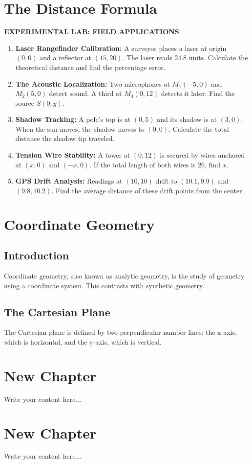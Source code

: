 \chapter{The Distance Formula}
\noindent
\colorbox{practicegreen}{\parbox{\dimexpr\linewidth-2\fboxsep}{\centering\small\bfseries\color{white} EXPERIMENTAL LAB: FIELD APPLICATIONS}}
\vspace{15pt}

\begin{enumerate}
    \item \textbf{Laser Rangefinder Calibration:} A surveyor places a laser at origin $(0,0)$ and a reflector at $(15, 20)$. The laser reads $24.8$ units. Calculate the theoretical distance and find the percentage error.
    \item \textbf{The Acoustic Localization:} Two microphones at $M_1(-5, 0)$ and $M_2(5, 0)$ detect sound. A third at $M_3(0, 12)$ detects it later. Find the source $S(0, y)$.
    \item \textbf{Shadow Tracking:} A pole's top is at $(0, 5)$ and its shadow is at $(3, 0)$. When the sun moves, the shadow moves to $(0, 0)$. Calculate the total distance the shadow tip traveled.
    \item \textbf{Tension Wire Stability:} A tower at $(0, 12)$ is secured by wires anchored at $(x, 0)$ and $(-x, 0)$. If the total length of both wires is 26, find $x$.
    \item \textbf{GPS Drift Analysis:} Readings at $(10, 10)$ drift to $(10.1, 9.9)$ and $(9.8, 10.2)$. Find the average distance of these drift points from the center.
\end{enumerate}

\chapter{Coordinate Geometry}
\section{Introduction}
Coordinate geometry, also known as analytic geometry, is the study of geometry using a coordinate system. This contrasts with synthetic geometry.

\section{The Cartesian Plane}
The Cartesian plane is defined by two perpendicular number lines: the x-axis, which is horizontal, and the y-axis, which is vertical.

\chapter{New Chapter}
Write your content here...

\chapter{New Chapter}
Write your content here...

